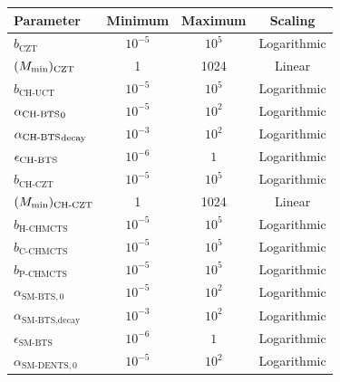 
    \begin{table}[tbp]
        \centering
        \begin{tabular}{l|c|c|c} 
            Parameter   
                & Minimum    
                & Maximum    
                & Scaling \\
            \hline
            $b_{\text{CZT}}$                        & $10^{-5}$     & $10^5$    & Logarithmic \\
            $(M_{\textnormal{min}})_{\text{CZT}}$                  & 1             & 1024      & Linear \\
            $b_{\text{CH-UCT}}$                     & $10^{-5}$     & $10^5$    & Logarithmic \\
            ${\alpha_{{\textnormal{CH-BTS}}}}_{0}$                       & $10^{-5}$     & $10^2$    & Logarithmic \\
            ${\alpha_{{\textnormal{CH-BTS}}}}_{\text{decay}}$            & $10^{-3}$     & $10^2$    & Logarithmic \\
            ${\epsilon_{{\textnormal{CH-BTS}}}}$                             & $10^{-6}$     & $1$       & Logarithmic \\
            $b_{\text{CH-CZT}}$                     & $10^{-5}$     & $10^5$    & Logarithmic \\
            $(M_{\textnormal{min}})_{\text{CH-CZT}}$               & 1             & 1024      & Linear \\
            $b_{\text{H-CHMCTS}}$                   & $10^{-5}$     & $10^5$    & Logarithmic \\
            $b_{\text{C-CHMCTS}}$                   & $10^{-5}$     & $10^5$    & Logarithmic \\
            $b_{\text{P-CHMCTS}}$                   & $10^{-5}$     & $10^5$    & Logarithmic \\
            $\alpha_{\text{SM-BTS},0}$              & $10^{-5}$     & $10^2$    & Logarithmic \\
            $\alpha_{\text{SM-BTS},\text{decay}}$   & $10^{-3}$     & $10^2$    & Logarithmic \\
            $\epsilon_{\text{SM-BTS}}$              & $10^{-6}$     & $1$       & Logarithmic \\
            $\alpha_{\text{SM-DENTS},0}$            & $10^{-5}$     & $10^2$    & Logarithmic \\

\end{tabular}
\end{table}

